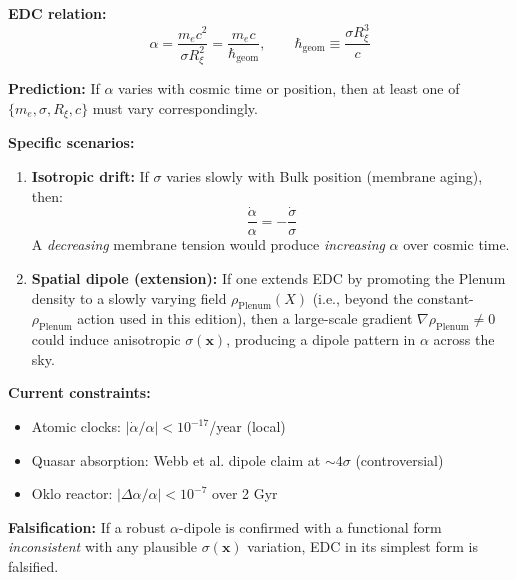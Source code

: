 \begin{tcolorbox}[colback=red!5,colframe=red!70,title={Prediction Pr1: Cosmic Alpha Variation}]

\textbf{EDC relation:}
\begin{equation}
\alpha = \frac{m_e c^2}{\sigma R_\xi^{2}} = \frac{m_e c}{\hbar_{\text{geom}}}, \qquad \hbar_{\text{geom}} \equiv \frac{\sigma R_\xi^{3}}{c}
\label{eq:alpha_edc}
\end{equation}

\textbf{Prediction:} If $\alpha$ varies with cosmic time or position, then at least one of $\{m_e, \sigma, R_\xi, c\}$ must vary correspondingly.

\textbf{Specific scenarios:}

\begin{enumerate}
    \item \textbf{Isotropic drift:} If $\sigma$ varies slowly with Bulk position (membrane aging), then:
    \begin{equation}
    \frac{\dot{\alpha}}{\alpha} = -\frac{\dot{\sigma}}{\sigma}
    \end{equation}
    A \textit{decreasing} membrane tension would produce \textit{increasing} $\alpha$ over cosmic time.
    
    \item \textbf{Spatial dipole (extension):} If one extends EDC by promoting the Plenum density to a slowly varying field $\rho_{\text{Plenum}}(X)$ (i.e., beyond the constant-$\rho_{\text{Plenum}}$ action used in this edition), then a large-scale gradient $\nabla\rho_{\text{Plenum}} \neq 0$ could induce anisotropic $\sigma(\mathbf{x})$, producing a dipole pattern in $\alpha$ across the sky.
\end{enumerate}

\textbf{Current constraints:}
\begin{itemize}
    \item Atomic clocks: $|\dot{\alpha}/\alpha| < 10^{-17}$/year (local)
    \item Quasar absorption: Webb et al. dipole claim at $\sim 4\sigma$ (controversial)
    \item Oklo reactor: $|\Delta\alpha/\alpha| < 10^{-7}$ over 2 Gyr
\end{itemize}

\textbf{Falsification:} If a robust $\alpha$-dipole is confirmed with a functional form \textit{inconsistent} with any plausible $\sigma(\mathbf{x})$ variation, EDC in its simplest form is falsified.
\end{tcolorbox}

